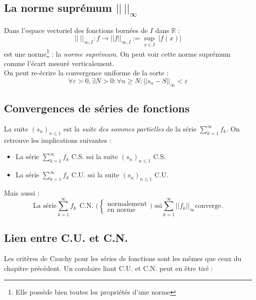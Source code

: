 \documentclass[11pt, a4paper, openany]{book}
\newcommand{\serie}{\sum_{k=1}^\infty}
\begin{document}
		\subsection{La norme suprémum $||\ ||_\infty$}
		Dans l'espace vectoriel des fonctions bornées de $I$ dans $\mathbb{R}$ :
		\begin{equation}
			||\ ||_{\infty, I} : f \rightarrow ||f||_{\infty, I} := \sup\limits_{x \in I}\ |f(x)|
		\end{equation}
		est une norme\footnote{Elle possède bien toutes les propriétés d'une norme} : la \textit{norme suprémum}. On peut voir cette norme suprémum comme l'écart mesuré verticalement. \\
		On peut re-écrire la convergence uniforme de la sorte :
		\begin{equation}
			\forall \varepsilon > 0, \exists N >0: \forall n \geq N :  ||s_n - S||_\infty < \varepsilon
		\end{equation}
							
		\setcounter{subsection}{4}
		\subsection{Convergences de séries de fonctions}
		La suite $(s_n)_{n\leq 1}$ est la \textit{suite des sommes partielles} de la série $\serie f_k$. On retrouve les implications suivantes :
		\begin{itemize}
			\item La série $\serie f_k$ C.S. ssi la suite $(s_n)_{n\leq 1}$ C.S.
			\item La série $\serie f_k$ C.U. ssi la suite $(s_n)_{n\leq 1}$ C.U. 
		\end{itemize}
		Mais aussi :
		\begin{equation}
			\text{La série} \serie f_k\ \ \text{C.N. ($\left\{\begin{array}{l}
				\text{normalement}\\
				\text{en norme}
				\end{array}\right.$) ssi} \serie ||f_k||_\infty \text{converge}.
		\end{equation}
							
		\setcounter{subsection}{6}
		\subsection{Lien entre C.U. et C.N.}
		Les critères de Cauchy pour les séries de fonctions sont les mêmes que ceux du chapitre précédent. Un corolaire liant C.U. et C.N. peut en être tiré :
		\corollaire{\begin{equation}
			\serie f_k\ \ \text{C.N.}\ \ \underset{\nLeftarrow}{\Rightarrow}\ \ \serie f_k\ \ \text{C.U.}
			\end{equation}}
							
\end{document}
